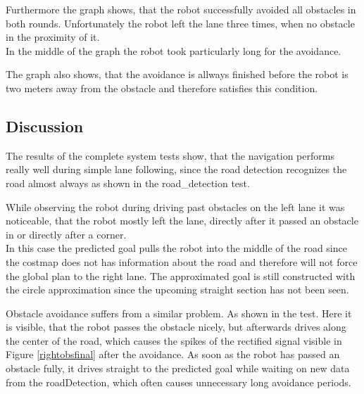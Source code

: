 Furthermore the graph shows, that the robot successfully avoided all obstacles in both rounds. Unfortunately the robot left the lane three times, when no obstacle in the proximity of it.\\

In the middle of the graph the robot took particularly long for the avoidance.

The graph also shows, that the avoidance is allways finished before the robot is two meters away from the obstacle and therefore satisfies this condition.

\subsection{Discussion}

The results of the complete system tests show, that the navigation performs really well during simple lane following, since the road detection recognizes the road almost always as shown in the road\_detection test.

While observing the robot during driving past obstacles on the left lane it was noticeable, that the robot mostly left the lane, directly after it passed an obstacle in or directly after a corner.\\ 
In this case the predicted goal pulls the robot into the middle of the road since the costmap does not has information about the road and therefore will not force the global plan to the right lane. The approximated goal is still constructed with the circle approximation since the upcoming straight section has not been seen.\\

Obstacle avoidance suffers from a similar problem. As shown in the  test. Here it is visible, that the robot passes the obstacle nicely, but afterwards drives along the center of the road, which causes the spikes of the rectified signal visible in Figure \ref{rightobsfinal} after the avoidance. As soon as the robot has passed an obstacle fully, it drives straight to the predicted goal while waiting on new data from the roadDetection, which often causes unnecessary long avoidance periods.





